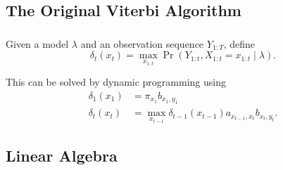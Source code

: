 \documentclass[english,notes]{beamer}
\begin{document}
\subsection{The Original Viterbi Algorithm}
\begin{frame}
  \frametitle{\insertsubsection}
  \onslide<+->
  Given a model $\lambda$ and an observation sequence $Y_{1:T}$, define
  \begin{equation*}
    \delta_t(x_t) = \max_{x_{1:t}} \Pr(Y_{1:t}, X_{1:t} = x_{1:t} \mid \lambda).
  \end{equation*}

  \onslide<+->
  This can be solved by dynamic programming using
  \begin{equation*}
    \begin{aligned}
      \delta_1(x_1) &= \pi_{x_1} b_{x_1, y_1} \\
      \delta_t(x_t) &= \max_{x_{t - 1}} \delta_{t - 1}(x_{t - 1}) a_{x_{t - 1}, x_t} b_{x_t, y_t} .
    \end{aligned}
  \end{equation*}

  \onslide<+->
  \begin{center}
    
  \end{center}



\end{frame}

\subsection{Linear Algebra}
\end{document}
